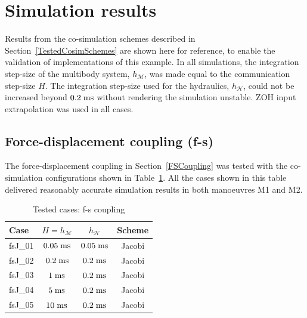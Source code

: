 \documentclass[fleqn,11pt]{article}
\renewcommand{\arraystretch}{1.136}
\newcommand{\unit}[1]		{ {\; \rm #1} }
\newcommand{\hM}    	{ h_{\mathcal{M}} }
\newcommand{\hH}     	{ h_{\mathcal{H}} }
\begin{document}
\newpage
\section{Simulation results}
\label{Results}

Results from the co-simulation schemes described in Section~\ref{TestedCosimSchemes} are shown here for reference, to enable the validation of implementations of this example.
In all simulations, the integration step-size of the multibody system, $\hM$, was made equal to the communication step-size $H$.  
The integration step-size used for the hydraulics, $\hH$, could not be increased beyond $0.2\unit{ms}$ without rendering the simulation unstable.
ZOH input extrapolation was used in all cases.

\subsection{Force-displacement coupling (f-s)}
\label{FSCouplingResults}

The force-displacement coupling in Section~\ref{FSCoupling} was tested with the co-simulation configurations shown in Table~\ref{tab:fsCouplingResults}.
All the cases shown in this table delivered reasonably accurate simulation results in both manoeuvres M1 and M2.

\begin{table}[!ht]
\begin{center}
{
	\renewcommand{\arraystretch}{1.25}
	\begin{tabular}{lccc}
		\hline
		Case  	& $H = \hM$ 		& $\hH$ 			& Scheme \\
		\hline
		fsJ\_01 & $0.05\unit{ms}$ 	& $0.05\unit{ms}$ 	& Jacobi \\
		fsJ\_02 & $0.2\unit{ms}$ 	& $0.2\unit{ms}$ 	& Jacobi \\
		fsJ\_03 & $1\unit{ms}$ 		& $0.2\unit{ms}$ 	& Jacobi \\
		fsJ\_04 & $5\unit{ms}$ 		& $0.2\unit{ms}$ 	& Jacobi \\
		fsJ\_05 & $10\unit{ms}$ 	& $0.2\unit{ms}$ 	& Jacobi \\
		\hline
	\end{tabular}
}
\end{center}
\caption{Tested cases: f-s coupling}
\label{tab:fsCouplingResults}
\end{table}
\end{document}

